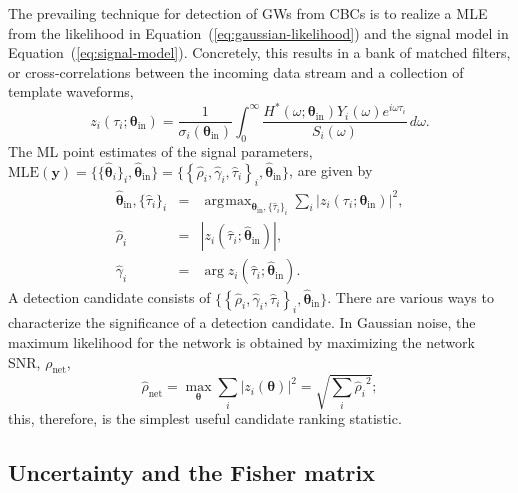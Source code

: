 \documentclass[amsmath,amssymb,aps,prx,reprint,nopreprintnumbers,nofootinbib,showpacs]{revtex4-1}
\DeclareMathOperator*{\argmax}{\arg\!\max}
\begin{document}
The prevailing technique for detection of \acp{GW} from \acp{CBC} is to realize a \ac{MLE} from the likelihood in Equation~(\ref{eq:gaussian-likelihood}) and the signal model in Equation~(\ref{eq:signal-model}). Concretely, this results in a bank of matched filters, or cross-correlations between the incoming data stream and a collection of template waveforms,
%
\begin{equation}
z_i(\tau_i;\bm\theta_\mathrm{in}) = \frac{1}{\sigma_i (\bm\theta_\mathrm{in})} \int_0^\infty \frac{H^*(\omega; \bm\theta_\mathrm{in}) Y_i(\omega) e^{i \omega \tau_i}}{S_i(\omega)} \,d\omega.
\end{equation}
%
The \ac{ML} point estimates of the signal parameters, $\mathrm{MLE}(\mathbf{y}) = \{\{ \hat{\bm\theta}_i \}_i, \hat{\bm\theta}_\mathrm{in}\} = \{\left\{ \hat\rho_i, \hat\gamma_i, \hat\tau_i \right\}_i, \hat{\bm\theta}_\mathrm{in}\}$, are given by
%
\begin{eqnarray}
    \label{eq:optimal-tau}
    \hat{\bm\theta}_\mathrm{in}, \{\hat\tau_i\}_i
        &=& \argmax_{\bm\theta_\mathrm{in}, \{\hat\tau_i\}_i}
        \sum_i \left| z_i\left(\tau_i;
        \bm\theta_\mathrm{in}\right) \right|^2, \\
    \label{eq:optimal-rho}
    \hat\rho_i &=& \left| z_i\left(\hat\tau_i;
        \hat{\bm\theta}_\mathrm{in}\right) \right|, \\
    \label{eq:optimal-gamma}
    \hat\gamma_i &=& \arg z_i\left(\hat\tau_i;
        \hat{\bm\theta}_\mathrm{in}\right).
\end{eqnarray}
%
A detection candidate consists of $\{\left\{ \hat\rho_i, \hat\gamma_i, \hat\tau_i \right\}_i, \hat{\bm\theta}_\mathrm{in}\}$. There are various ways to characterize the significance of a detection candidate. In Gaussian noise, the maximum likelihood for the network is obtained by maximizing the network \ac{SNR}, $\rho_\mathrm{net}$,
%
\begin{equation}
    \hat\rho_\mathrm{net} = \max_{\bm\theta} \sum_i {|z_i({\bm\theta})|}^2 = \sqrt{\sum_i {\hat\rho_i}^2};
\end{equation}
%
this, therefore, is the simplest useful candidate ranking statistic.

\subsection{Uncertainty and the Fisher matrix}
\label{sec:fisher}
\end{document}
